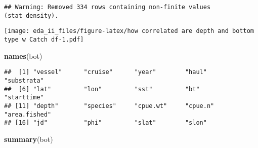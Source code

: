 \documentclass[
]{article}
\newenvironment{Shaded}{\begin{snugshade}}{\end{snugshade}}
\newcommand{\KeywordTok}[1]{\textcolor[rgb]{0.13,0.29,0.53}{\textbf{#1}}}
\newcommand{\NormalTok}[1]{#1}
\begin{document}
\begin{verbatim}
## Warning: Removed 334 rows containing non-finite values (stat_density).
\end{verbatim}

\texttt{[image: eda\_ii\_files/figure-latex/how correlated are depth and bottom type w Catch df-1.pdf]}

\begin{Shaded}
\begin{Highlighting}[]
\KeywordTok{names}\NormalTok{(bot)}
\end{Highlighting}
\end{Shaded}

\begin{verbatim}
##  [1] "vessel"      "cruise"      "year"        "haul"        "substrata"  
##  [6] "lat"         "lon"         "sst"         "bt"          "starttime"  
## [11] "depth"       "species"     "cpue.wt"     "cpue.n"      "area.fished"
## [16] "jd"          "phi"         "slat"        "slon"
\end{verbatim}

\begin{Shaded}
\begin{Highlighting}[]
\KeywordTok{summary}\NormalTok{(bot)}
\end{Highlighting}
\end{Shaded}
\end{document}
